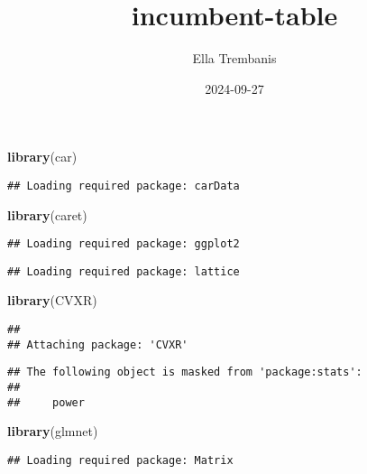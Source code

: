 \documentclass[
]{article}
\title{incumbent-table}
\author{Ella Trembanis}
\date{2024-09-27}
\newenvironment{Shaded}{\begin{snugshade}}{\end{snugshade}}
\newcommand{\FunctionTok}[1]{\textcolor[rgb]{0.13,0.29,0.53}{\textbf{#1}}}
\newcommand{\NormalTok}[1]{#1}
\begin{document}
\maketitle

\begin{Shaded}
\begin{Highlighting}[]
\FunctionTok{library}\NormalTok{(car)}
\end{Highlighting}
\end{Shaded}

\begin{verbatim}
## Loading required package: carData
\end{verbatim}

\begin{Shaded}
\begin{Highlighting}[]
\FunctionTok{library}\NormalTok{(caret)}
\end{Highlighting}
\end{Shaded}

\begin{verbatim}
## Loading required package: ggplot2
\end{verbatim}

\begin{verbatim}
## Loading required package: lattice
\end{verbatim}

\begin{Shaded}
\begin{Highlighting}[]
\FunctionTok{library}\NormalTok{(CVXR)}
\end{Highlighting}
\end{Shaded}

\begin{verbatim}
## 
## Attaching package: 'CVXR'
\end{verbatim}

\begin{verbatim}
## The following object is masked from 'package:stats':
## 
##     power
\end{verbatim}

\begin{Shaded}
\begin{Highlighting}[]
\FunctionTok{library}\NormalTok{(glmnet)}
\end{Highlighting}
\end{Shaded}

\begin{verbatim}
## Loading required package: Matrix
\end{verbatim}
\end{document}
